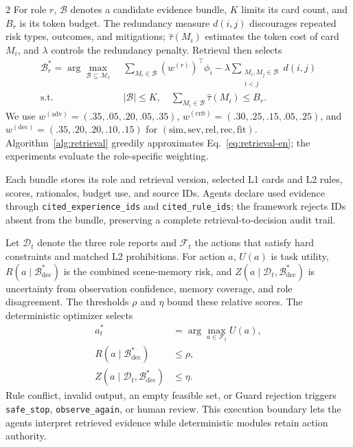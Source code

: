 \documentclass[10pt]{article}
\newcommand{\code}[1]{\texttt{#1}}
\begin{document}
\begin{multicols}{2}
For role $r$, $\mathcal{B}$ denotes a candidate evidence bundle, $K$ limits its card count, and $B_r$ is its token budget. The redundancy measure $d(i,j)$ discourages repeated risk types, outcomes, and mitigations; $\widehat{\tau}(M_i)$ estimates the token cost of card $M_i$, and $\lambda$ controls the redundancy penalty. Retrieval then selects
\begin{equation}
\begin{aligned}
\mathcal{B}_r^*=\arg\max_{\mathcal{B}\subseteq\mathcal{M}_t}\;&
\sum_{M_i\in\mathcal{B}}(w^{(r)})^\top\phi_i
-\lambda\!\sum_{\substack{M_i,M_j\in\mathcal{B}\\i<j}}d(i,j)\\
\text{s.t. }\;&|\mathcal{B}|\leq K,\quad
\sum_{M_i\in\mathcal{B}}\widehat{\tau}(M_i)\leq B_r .
\end{aligned}
\label{eq:retrieval-en}
\end{equation}
We use $w^{(\mathrm{adv})}=(.35,.05,.20,.05,.35)$, $w^{(\mathrm{crit})}=(.30,.25,.15,.05,.25)$, and $w^{(\mathrm{dec})}=(.35,.20,.20,.10,.15)$ for $(\mathrm{sim},\mathrm{sev},\mathrm{rel},\mathrm{rec},\mathrm{fit})$. Algorithm~\ref{alg:retrieval} greedily approximates Eq.~\eqref{eq:retrieval-en}; the experiments evaluate the role-specific weighting.

Each bundle stores its role and retrieval version, selected L1 cards and L2 rules, scores, rationales, budget use, and source IDs. Agents declare used evidence through \code{cited\_experience\_ids} and \code{cited\_rule\_ids}; the framework rejects IDs absent from the bundle, preserving a complete retrieval-to-decision audit trail.

Let $\mathcal{D}_t$ denote the three role reports and $\mathcal{F}_t$ the actions that satisfy hard constraints and matched L2 prohibitions. For action $a$, $U(a)$ is task utility, $R(a\mid\mathcal{B}_{\mathrm{dec}}^*)$ is the combined scene-memory risk, and $Z(a\mid\mathcal{D}_t,\mathcal{B}_{\mathrm{dec}}^*)$ is uncertainty from observation confidence, memory coverage, and role disagreement. The thresholds $\rho$ and $\eta$ bound these relative scores. The deterministic optimizer selects
\begin{equation}
\begin{aligned}
a_t^*&=\arg\max_{a\in\mathcal{F}_t}U(a),\\
R(a\mid\mathcal{B}_{\mathrm{dec}}^*)&\leq\rho,\\
Z(a\mid\mathcal{D}_t,\mathcal{B}_{\mathrm{dec}}^*)&\leq\eta.
\end{aligned}
\label{eq:decision-en}
\end{equation}
Rule conflict, invalid output, an empty feasible set, or Guard rejection triggers \code{safe\_stop}, \code{observe\_again}, or human review. This execution boundary lets the agents interpret retrieved evidence while deterministic modules retain action authority.


\end{multicols}
\end{document}

